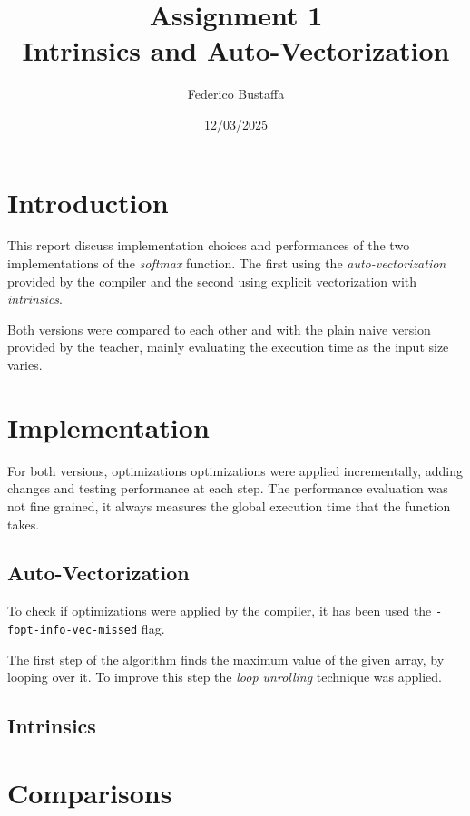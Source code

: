 \documentclass[12pt, a4paper]{article}
\title{Assignment 1\\Intrinsics and Auto-Vectorization}
\author{Federico Bustaffa}
\date{12/03/2025}
\begin{document}
\maketitle
\tableofcontents

\section{Introduction}

This report discuss implementation choices and performances of the two
implementations of the \textit{softmax} function. The first using the
\textit{auto-vectorization} provided by the compiler and the second using
explicit vectorization with \textit{intrinsics}.

Both versions were compared to each other and with the plain naive version
provided by the teacher, mainly evaluating the execution time as the input size
varies.

\section{Implementation}

For both versions, optimizations optimizations were applied incrementally,
adding changes and testing performance at each step. The performance evaluation
was not fine grained, it always measures the global execution time that the
function takes.

\subsection{Auto-Vectorization}

To check if optimizations were applied by the compiler, it has been used the
\verb|-fopt-info-vec-missed| flag.

The first step of the algorithm finds the maximum value of the given array, by
looping over it. To improve this step the \textit{loop unrolling} technique was
applied.

\subsection{Intrinsics}

\section{Comparisons}
\end{document}
